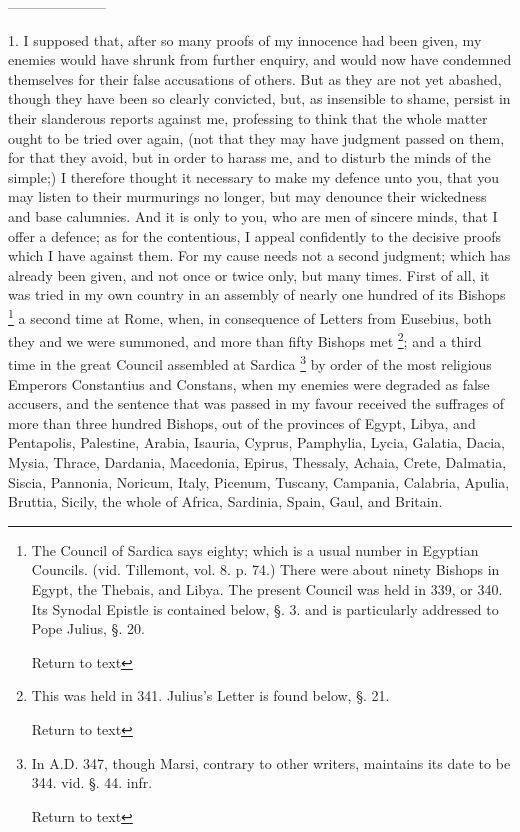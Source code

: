 ———————


1. I supposed that, after so many proofs of my
innocence had been given, my enemies would have shrunk from further
enquiry, and would now have condemned themselves for their false
accusations of others. But as they are not yet abashed, though they
have been so clearly convicted, but, as insensible to shame, persist
in their slanderous reports against me, professing to think that the
whole matter ought to be tried over again, (not that they may have
judgment passed on them, for that they avoid, but in order to harass
me, and to disturb the minds of the simple;) I therefore thought it
necessary to make my defence unto you, that you may listen to their
murmurings no longer, but may denounce their wickedness and base
calumnies. And it is only to you, who are men of sincere minds, that I
offer a defence; as for the contentious, I appeal confidently to the
decisive proofs which I have against them. For my cause needs not a
second judgment; which has already been given, and not once or twice
only, but many times. First of all, it was tried in my own country in
an assembly of nearly one hundred of its Bishops \footnote{The Council of Sardica says eighty; which is a
usual number in Egyptian Councils. (vid. Tillemont, vol. 8. p. 74.)
There were about ninety Bishops in Egypt, the Thebais, and Libya. The
present Council was held in 339, or 340. Its Synodal Epistle is
contained below, §. 3. and is particularly addressed to Pope Julius,
§. 20.

Return to text} a second time at Rome, when, in consequence of Letters from
Eusebius, both they and we were summoned, and more than fifty Bishops
met \footnote{This was held in 341. Julius's Letter is found below, §. 21.

Return to text}; and a third time in
the great Council assembled at Sardica \footnote{In A.D.
347, though Marsi, contrary to other writers, maintains its date to be
344. vid. §. 44. infr.

Return to text} by order of the most religious Emperors Constantius and
Constans, when my enemies were degraded as false accusers, and the
sentence that was passed in my favour received the suffrages of more
than three hundred Bishops, out of the provinces of Egypt, Libya, and
Pentapolis, Palestine, Arabia, Isauria, Cyprus, Pamphylia, Lycia,
Galatia, Dacia, Mysia, Thrace, Dardania, Macedonia, Epirus, Thessaly,
Achaia, Crete, Dalmatia, Siscia, Pannonia, Noricum, Italy, Picenum,
Tuscany, Campania, Calabria, Apulia, Bruttia, Sicily, the whole of
Africa, Sardinia, Spain, Gaul, and Britain.


